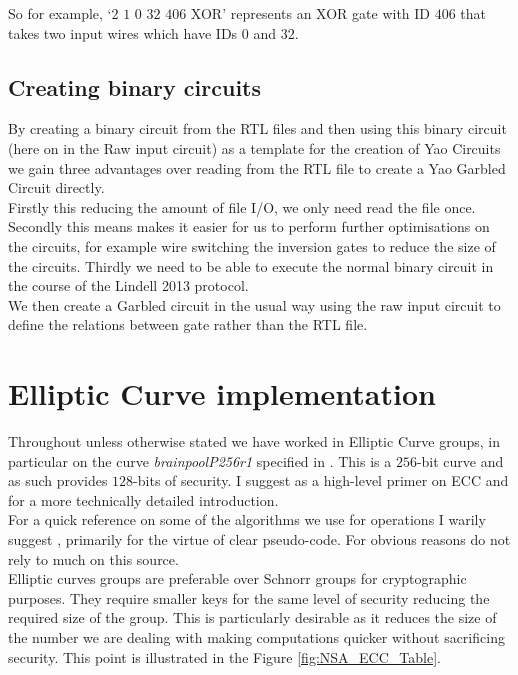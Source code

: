 \documentclass[ %
                    author={Nicholas Tutte},
                supervisor={Prof. Nigel Smart},
                    degree={MEng},
                     title={Secure Two Party Computation},
                  subtitle={A practical comparison of recent protocols},
                      type={Research - GG1K},
                      year={2015} ]{dissertation}
\begin{document}
				So for example, `$2$ $1$ $0$ $32$ $406$ XOR' represents an XOR gate with ID $406$ that takes two input wires which have IDs $0$ and $32$.

			\subsection{Creating binary circuits}
				By creating a binary circuit from the RTL files and then using this binary circuit (here on in the Raw input circuit) as a template for the creation of Yao Circuits we gain three advantages over reading from the RTL file to create a Yao Garbled Circuit directly.\\

				Firstly this reducing the amount of file I/O, we only need read the file once. Secondly this means makes it easier for us to perform further optimisations on the circuits, for example wire switching the inversion gates to reduce the size of the circuits. Thirdly we need to be able to execute the normal binary circuit in the course of the Lindell 2013 protocol.\\

				We then create a Garbled circuit in the usual way using the raw input circuit to define the relations between gate rather than the RTL file.

		\section{Elliptic Curve implementation}

			Throughout unless otherwise stated we have worked in Elliptic Curve groups, in particular on the curve \emph{brainpoolP256r1} specified in \cite{BrainpoolSpecifications}. This is a $256$-bit curve and as such provides $128$-bits of security. I suggest \cite{ECC_Primer} as a high-level primer on ECC and \cite{ECC_RFC_6090} for a more technically detailed introduction.\\

			For a quick reference on some of the algorithms we use for operations I warily suggest \cite{Wiki_ECC}, primarily for the virtue of clear pseudo-code. For obvious reasons do not rely to much on this source.\\

			Elliptic curves groups are preferable over Schnorr groups for cryptographic purposes. They require smaller keys for the same level of security reducing the required size of the group. This is particularly desirable as it reduces the size of the number we are dealing with making computations quicker without sacrificing security. This point is illustrated in the Figure \ref{fig:NSA_ECC_Table}.\\
\end{document}
